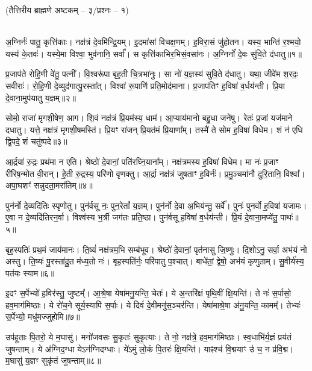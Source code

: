 
\vspace{-1ex}
\centerline{\normalsize(तैत्तिरीय ब्राह्मणे अष्टकम् -- ३/प्रश्नः -- १)}\mbox{}\\[-2em]

अ॒ग्निर्नः॑ पातु॒ कृत्ति॑काः। नक्ष॑त्रं दे॒वमि॑न्द्रि॒यम्। इ॒दमा॑सां विचक्ष॒णम्। ह॒विरा॒सं जु॑होतन। यस्य॒ भान्ति॑ र॒श्मयो॒ यस्य॑ के॒तवः॑। यस्ये॒मा विश्वा॒ भुव॑नानि॒ सर्वा᳚। स कृत्ति॑काभि\-र॒भिसं॒वसा॑नः। अ॒ग्निर्नो॑ दे॒वः सु॑वि॒ते द॑धातु॥१॥ 

प्र॒जाप॑ते रोहि॒णी वे॑तु॒ पत्नी᳚। वि॒श्वरू॑पा बृह॒ती चि॒त्रभा॑नुः। सा नो॑ य॒ज्ञस्य॑ सुवि॒ते द॑धातु। यथा॒ जीवे॑म श॒रदः॒ सवीराः॑। रो॒हि॒णी दे॒व्युद॑गात्पु॒रस्ता᳚त्। विश्वा॑ रू॒पाणि॑ प्रति॒मोद॑माना। प्र॒जाप॑तिꣳ ह॒विषा॑ व॒र्धय॑न्ती। प्रि॒या दे॒वाना॒मुप॑यातु य॒ज्ञम्॥२॥ 

सोमो॒ राजा॑ मृगशी॒\ar{}षेण॒ आग\snn{}। शि॒वं नक्ष॑त्रं प्रि॒यम॑स्य॒ धाम॑। आ॒प्याय॑मानो बहु॒धा जने॑षु। रेतः॑ प्र॒जां यज॑माने दधातु। यत्ते॒ नक्ष॑त्रं मृगशी॒\ar{}षमस्ति॑। प्रि॒यꣳ रा॑जन् प्रि॒यत॑मं प्रि॒याणा᳚म्। तस्मै॑ ते सोम ह॒विषा॑ विधेम। शं न॑ एधि द्वि॒पदे॒ शं चतु॑ष्पदे॥३॥ 

आ॒र्द्रया॑ रु॒द्रः प्रथ॑मा न एति। श्रेष्ठो॑ दे॒वानां॒ पति॑रघ्नि॒याना᳚म्। नक्ष॑त्रमस्य ह॒विषा॑ विधेम। मा नः॑ प्र॒जाꣳ री॑रिष॒न्मोत वी॒रान्। हे॒ती रु॒द्रस्य॒ परि॑णो वृणक्तु। आ॒र्द्रा नक्ष॑त्रं जुषताꣳ ह॒विर्नः॑। प्र॒मु॒ञ्चमा॑नौ दुरि॒तानि॒ विश्वा᳚। अपा॒घशꣳ॑ सन्नुदता॒मरा॑तिम्॥४॥ 

पुन॑र्नो दे॒व्यदि॑तिः स्पृणोतु। पुन॑र्वसू नः॒ पुन॒रेतां᳚ य॒ज्ञम्। पुन॑र्नो दे॒वा अ॒भिय॑न्तु॒ सर्वे᳚। पुनः॑ पुनर्वो ह॒विषा॑ यजामः। ए॒वा न दे॒व्यदि॑तिरन॒र्वा। विश्व॑स्य भ॒र्त्री जग॑तः प्रति॒ष्ठा। पुन॑र्वसू ह॒विषा॑ व॒र्धय॑न्ती। प्रि॒यं दे॒वाना॒मप्ये॑तु॒ पाथः॑॥५॥ 

बृह॒स्पतिः॑ प्रथ॒मं जाय॑मानः। ति॒ष्यं॑ नक्ष॑त्रम॒भि सम्ब॑भूव। श्रेष्ठो॑ दे॒वानां॒ पृत॑नासु  जि॒ष्णुः। दि॒शोऽनु॒ सर्वा॒ अभ॑यं नो अस्तु। ति॒ष्यः॑ पु॒रस्ता॑दु॒त म॑ध्य॒तो नः॑। बृह॒स्पति॑र्नः॒ परि॑पातु प॒श्चात्। बाधे॑तां॒ द्वेषो॒ अभ॑यं कृणुताम्। सु॒वीर्य॑स्य॒ पत॑यः स्याम॥६॥ 

इ॒दꣳ स॒र्पेभ्यो॑ ह॒विर॑स्तु॒ जुष्टम्᳚। आ॒श्रे॒षा येषा॑मनु॒यन्ति॒ चेतः॑। ये अ॒न्तरि॑क्षं पृथि॒वीं क्षि॒यन्ति॑। ते नः॑ स॒र्पासो॒ हव॒माग॑मिष्ठाः। ये रो॑च॒ने सूर्य॒स्यापि॑ स॒र्पाः। ये दिवं॑ दे॒वीमनु॑स॒ञ्चर॑न्ति। येषा॑माश्रे॒षा अ॑नु॒यन्ति॒ कामम्᳚। तेभ्यः॑ स॒र्पेभ्यो॒ मधु॑मज्जुहोमि॥७॥ 

उप॑हूताः पि॒तरो॒ ये म॒घासु॑। मनो॑जवसः सु॒कृतः॑ सुकृ॒त्याः। ते नो॒ नक्ष॑त्रे॒ हव॒माग॑मिष्ठाः। स्व॒धाभि॑र्य॒ज्ञं प्रय॑तं जुषन्ताम्। ये अ॑ग्निद॒ग्धा येऽन॑ग्निदग्धाः। ये॑ऽमुं लो॒कं पि॒तरः॑ क्षि॒यन्ति॑। याꣴश्च॑ वि॒द्मयाꣳ उ॑ च॒ न प्र॑वि॒द्म। म॒घासु॑ य॒ज्ञꣳ सुकृ॑तं जुषन्ताम्॥८॥ 

